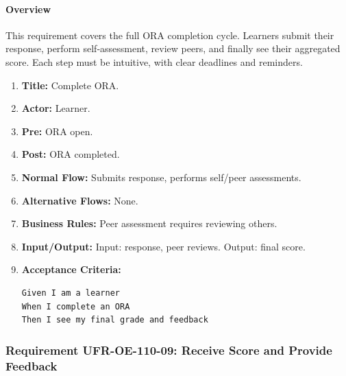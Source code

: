\paragraph{Overview}
This requirement covers the full ORA completion cycle. Learners submit their response, perform self‑assessment, review peers, and finally see their aggregated score. Each step must be intuitive, with clear deadlines and reminders.
\begin{enumerate}[label=\textbf{\arabic*.}]
\item \textbf{Title:} Complete ORA.
\item \textbf{Actor:} Learner.
\item \textbf{Pre:} ORA open.
\item \textbf{Post:} ORA completed.
\item \textbf{Normal Flow:} Submits response, performs self/peer assessments.
\item \textbf{Alternative Flows:} None.
\item \textbf{Business Rules:} Peer assessment requires reviewing others.
\item \textbf{Input/Output:} Input: response, peer reviews. Output: final score.
\item \textbf{Acceptance Criteria:}
    \begin{verbatim}
Given I am a learner
When I complete an ORA
Then I see my final grade and feedback
    \end{verbatim}
\end{enumerate}

\subsubsection{Requirement UFR-OE-110-09: Receive Score and Provide Feedback}
